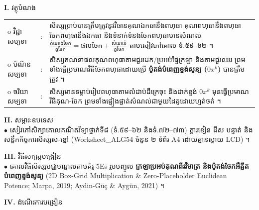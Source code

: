 \documentclass[a4paper,10pt]{article}
\newcommand{\wcirc}{{\CourierBullet\fontsize{9.5pt}{11pt}\selectfont o}}
\newcommand{\en}[1]{{\TimesEn #1}}
\begin{document}
\textbf{I.} {\muol វត្ថុបំណង}\\[1pt]
\hspace*{0.55cm}%
\begin{tabular}{@{}l l L{14.2cm}@{}}
  \wcirc \hspace{0.25cm} វិជ្ជាសម្បទា & : & សិស្សប្រាប់បានត្រឹមត្រូវនូវវិធានគុណឯកធានឹងពហុធា គុណពហុធានឹងពហុធា ចែកពហុធានឹងឯកធា និងទំនាក់ទំនងចែកពហុធាមានសំណល់ $\frac{\text{តំណាងចែក}}{\text{តួចែក}} = \text{ផលចែក} + \frac{\text{សំណល់}}{\text{តួចែក}}$ តាមសៀវភៅគោល ទំ.៥៩--៦២ ។ \\
  \wcirc \hspace{0.25cm} បំណិនសម្បទា & : & សិស្សគណនាផលគុណពហុធាតាមជួរដេក/ប្រអប់ផ្ទៃក្រឡា និងតាមជួរឈរ ព្រមទាំងធ្វើប្រមាណវិធីចែកពហុធាដោយប្រើ \textbf{ប៉ូតង់បំពេញខ្ទង់សូន្យ ($0x^k$)} បានត្រឹមត្រូវ ។ \\
  \wcirc \hspace{0.25cm} ចរិយាសម្បទា & : & សិស្សមានទម្លាប់រៀបពហុធាតាមលំដាប់ដឺក្រេចុះ និងដាក់ខ្ទង់ $0x^k$ មុនធ្វើប្រមាណវិធីគុណ-ចែក ព្រមទាំងផ្ទៀងផ្ទាត់សំណល់ជាមួយដៃគូដោយហ្មត់ចត់ ។ \\
\end{tabular}

\vspace{1pt}

\textbf{II.} {\muol សម្ភារៈឧបទេស}\\[1pt]
\hspace*{0.55cm}$\bullet$ \hspace{0.35cm} សៀវភៅសិក្សាគោលគណិតវិទ្យាថ្នាក់ទី៨ (ទំ.៥៩--៦២ និងទំ.៧២--៧៣) ក្ដារខៀន ដីស បន្ទាត់ និងសន្លឹកកិច្ចការសិស្សស-ខ្មៅ (\en{Worksheet\_ALG54} ចំនួន ២ ទំព័រ \en{A4} ដោយគ្មានស្លាយ \en{LCD}) ។

\vspace{1pt}

\textbf{III.} {\muol វិធីសាស្រ្តបង្រៀន}\\[1pt]
\hspace*{0.55cm}$\bullet$ \hspace{0.35cm} គោលវិធីសិស្សមជ្ឈមណ្ឌលតាមគំរូ \en{5Es} រួមបញ្ចូល \textbf{ក្រឡាប្រអប់គុណពីរវិមាត្រ និងប៉ូតង់ចែកអឺគ្លីតបំពេញខ្ទង់សូន្យ} (\en{2D Box-Grid Multiplication \& Zero-Placeholder Euclidean Potence}; \en{Marpa, 2019; Aydin-G\"u\c{c} \& Ayg\"un, 2021}) ។

\vspace{2pt}

\textbf{IV.} {\muol ដំណើរការបង្រៀន}\\[-6pt]
\end{document}
